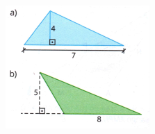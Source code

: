 \documentclass[a4paper,14pt]{article}
\begin{document}
\begin{multicols}{2}
\begin{enumerate}
	        \includegraphics[width=1\linewidth]{8FMA25_imagens/imagem5}

\end{enumerate}
\end{multicols}
\end{document}
